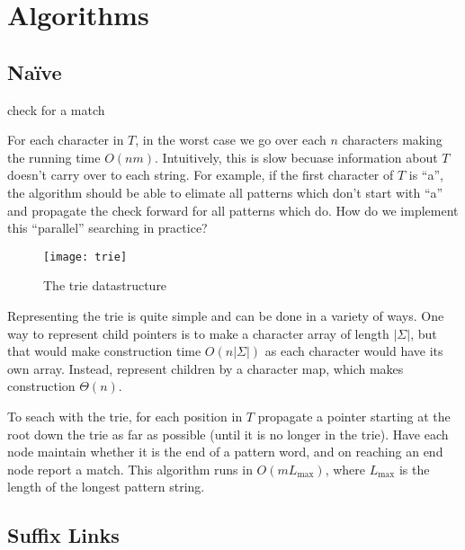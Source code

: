 \documentclass[11pt, oneside]{article}
\begin{document}
\newpage

\section{Algorithms}
\subsection{Naïve}

\begin{algorithm}
  \begin{algorithmic}[h!]
            \State check for a match
          \EndFor
      \EndFor
    \EndProcedure
  \end{algorithmic}
\end{algorithm}

For each character in \( T \), in the worst case we go over each \( n \)
characters making the running time \( O(nm) \). Intuitively, this is slow
becuase information about \( T \) doesn't carry over to each string.
For example, if the first character of \( T \) is ``a'', the algorithm should be
able to elimate all patterns which don't start with ``a'' and propagate the check
forward for all patterns which do. How do we implement this ``parallel'' searching in practice?

\begin{figure}[h!]
\centering
\texttt{[image: trie]}
\caption{The trie datastructure}
\end{figure}

Representing the trie is quite simple and can be done in a variety of ways.
One way to represent child pointers is to make a character array of length \( |\Sigma| \),
but that would make construction time \( O(n |\Sigma|) \) as each character would have its own array.
Instead, represent children by a character map, which makes construction \( \Theta(n) \).

To seach with the trie, for each position in \( T \) propagate a pointer starting at the root down the trie as far as possible (until it is no longer in the trie).
Have each node maintain whether it is the end of a pattern word, and on reaching an end node report a match.
This algorithm runs in \( O(m L_\text{max}) \), where \( L_\text{max} \) is the length of the longest pattern string.

\subsection{Suffix Links}
\end{document}
